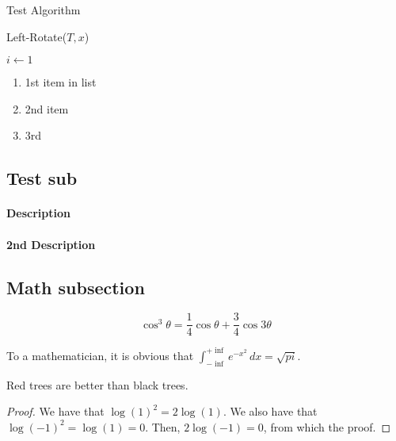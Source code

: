 \documentclass[10pt, 
a4paper, 
oneside, 
headinclude, footinclude, 
BCOR5mm]
{scrartcl}
\begin{document}
Test Algorithm
\IncMargin{1em}
\begin{algorithm}
    \caption{Left-Rotate($T,x$)}
    \BlankLine

    $i \gets 1$\;

\end{algorithm}\DecMargin{1em}


\begin{enumerate}
    \item 1st item in list
    \item 2nd item 
    \item 3rd
\end{enumerate}

\subsection{Test sub}

\paragraph{Description}
\paragraph{2nd Description}

\subsection{Math subsection}

\begin{equation}
    \cos^3 \theta = \frac{1}{4}\cos\theta + \frac{3}{4}\cos 3\theta
    \label{eq:refname2}
\end{equation}

\begin{definition}[Gauss]
    To a mathematician, it is obvious that
    $\int_{-\inf}^{+\inf} e^{-x^2}\, dx=\sqrt{pi}$.
\end{definition}

\begin{theorem}
    Red trees are better than black trees.
\end{theorem}

\begin{proof}
    We have that $\log(1)^2 = 2\log(1)$.
    We also have that $\log(-1)^2 = \log(1) = 0$.
    Then, $2\log(-1) = 0$, from which the proof.
\end{proof}
\end{document}

